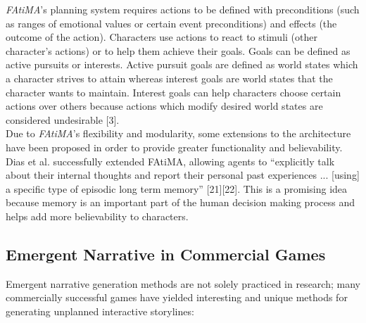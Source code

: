 \documentclass{sig-alternate-05-2015}
\begin{document}
\textit{FAtiMA}'s planning system requires actions to be defined with preconditions (such as ranges of emotional values or certain event preconditions) and effects (the outcome of the action). Characters use actions to react to stimuli (other character's actions) or to help them achieve their goals. Goals can be defined as active pursuits or interests. Active pursuit goals are defined as world states which a character strives to attain whereas interest goals are world states that the character wants to maintain. Interest goals can help characters choose certain actions over others because actions which modify desired world states are considered undesirable [3].\\

\newline Due to \textit{FAtiMA}'s flexibility and modularity, some extensions to the architecture have been proposed in order to provide greater functionality and believability. Dias et al. successfully extended FAtiMA, allowing agents to ``explicitly talk about their internal thoughts and report their personal past experiences ... [using] a specific type of episodic long term memory'' [21][22]. This is a promising idea because memory is an important part of the human decision making process and helps add more believability to characters.

\subsection{Emergent Narrative in Commercial Games}
Emergent narrative generation methods are not solely practiced in research; many commercially successful games have yielded interesting and unique methods for generating unplanned interactive storylines:
\end{document}
